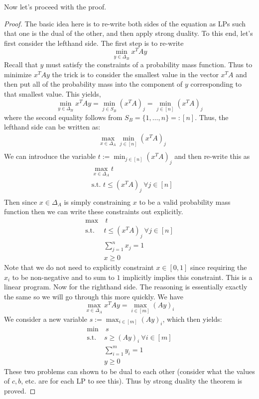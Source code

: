 \documentclass[12pt]{article}
\begin{document}
Now let's proceed with the proof. 
\begin{proof}
The basic idea here is to re-write both sides of the equation as LPs such that one is the dual of the other, and then apply strong duality. To this end, let's first consider the lefthand side. The first 
step is to re-write
\[\min_{y \in \Delta_B} x^T A y\]
Recall that $y$ must satisfy the constraints of a probability mass function. Thus to minimize $x^T A y$ the trick is to consider the smallest value in the vector $x^T A$ and then put all of the probability
mass into the component of $y$ corresponding to that smallest value. This yields, 
\[\min_{y \in \Delta_B} x^T A y = \min_{j \in S_B} (x^T A)_j = \min_{j \in [n]} (x^T A)_j\]
where the second equality follows from $S_B = \{1, \dots, n\} =: [n]$. Thus, the lefthand side can be written as: 
\begin{align*}
&\max_{x \in \Delta_A}  \min_{j \in [n]} (x^T A)_j \\
\end{align*}
We can introduce the variable $t := \min_{j \in [n]} (x^T A)_j$ and then re-write this as
\begin{align*}
&\max_{x \in \Delta_A}  t \\
&\text{s.t. } t \leq (x^T A)_j \ \forall j \in [n]  \\
\end{align*}
Then since $x \in \Delta_A$ is simply constraining $x$ to be a valid probability mass function then we can write these constraints out explicitly. 
\begin{align*}
\max & \ t \\
\text{s.t. } &t \leq (x^T A)_j \ \forall j \in [n]  \\
&\sum_{j = 1}^{n} x_j = 1 \\
&x \geq 0
\end{align*}
Note that we do not need to explicitly constraint $x \in [0, 1]$ since requiring the $x_i$ to be non-negative and to sum to $1$ implicitly implies this constraint. This is a linear 
program. Now for the righthand side. The reasoning is essentially exactly the same so we will go through this more quickly. We have 
\[ \max_{x \in \Delta_A} x^T A y = \max_{i \in [m]} (Ay)_i\]
We consider a new variable $s := \max_{i \in [m]} (Ay)_i$, which then yields: 
\begin{align*}
\min & \ s \\
\text{s.t. } &s \geq (Ay)_i \ \forall i \in [m]  \\
&\sum_{i = 1}^{m} y_i = 1 \\
&y \geq 0
\end{align*}
These two problems can shown to be dual to each other (consider what the values of $c, b$, etc. are for each LP to see this). Thus by strong duality the theorem is proved. 
\end{proof}
\end{document}
